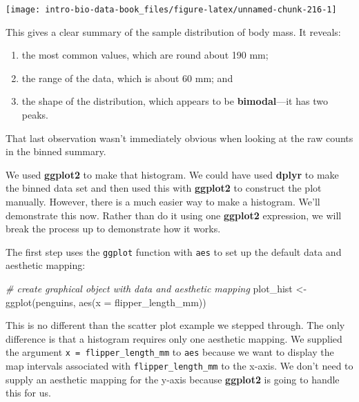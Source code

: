 \documentclass[
]{book}
\newenvironment{Shaded}{\begin{snugshade}}{\end{snugshade}}
\newcommand{\AttributeTok}[1]{\textcolor[rgb]{0.77,0.63,0.00}{#1}}
\newcommand{\CommentTok}[1]{\textcolor[rgb]{0.56,0.35,0.01}{\textit{#1}}}
\newcommand{\FunctionTok}[1]{\textcolor[rgb]{0.00,0.00,0.00}{#1}}
\newcommand{\NormalTok}[1]{#1}
\newcommand{\OtherTok}[1]{\textcolor[rgb]{0.56,0.35,0.01}{#1}}
\providecommand{\tightlist}{%
  \setlength{\itemsep}{0pt}\setlength{\parskip}{0pt}}
\begin{document}
\begin{center}\texttt{[image: intro-bio-data-book\_files/figure-latex/unnamed-chunk-216-1]} \end{center}

This gives a clear summary of the sample distribution of body mass. It reveals:

\begin{enumerate}
\def\labelenumi{\arabic{enumi}.}
\tightlist
\item
  the most common values, which are round about 190 mm;
\item
  the range of the data, which is about 60 mm; and
\item
  the shape of the distribution, which appears to be \textbf{bimodal}---it has two peaks.
\end{enumerate}

That last observation wasn't immediately obvious when looking at the raw counts in the binned summary.

We used \textbf{ggplot2} to make that histogram. We could have used \textbf{dplyr} to make the binned data set and then used this with \textbf{ggplot2} to construct the plot manually. However, there is a much easier way to make a histogram. We'll demonstrate this now. Rather than do it using one \textbf{ggplot2} expression, we will break the process up to demonstrate how it works.

The first step uses the \texttt{ggplot} function with \texttt{aes} to set up the default data and aesthetic mapping:

\begin{Shaded}
\begin{Highlighting}[]
\CommentTok{\# create graphical object with data and aesthetic mapping}
\NormalTok{plot\_hist }\OtherTok{\textless{}{-}} \FunctionTok{ggplot}\NormalTok{(penguins, }\FunctionTok{aes}\NormalTok{(}\AttributeTok{x =}\NormalTok{ flipper\_length\_mm))}
\end{Highlighting}
\end{Shaded}

This is no different than the scatter plot example we stepped through. The only difference is that a histogram requires only one aesthetic mapping. We supplied the argument \texttt{x\ =\ flipper\_length\_mm} to \texttt{aes} because we want to display the map intervals associated with \texttt{flipper\_length\_mm} to the x-axis. We don't need to supply an aesthetic mapping for the y-axis because \textbf{ggplot2} is going to handle this for us.
\end{document}
